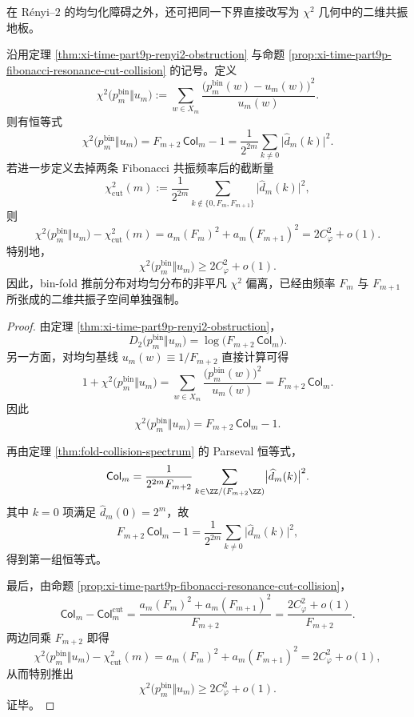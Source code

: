 在 Rényi--\(2\) 的均匀化障碍之外，还可把同一下界直接改写为 \(\chi^2\) 几何中的二维共振地板。

\begin{theorem}\label{thm:xi-time-part9p-chi2-ranktwo-resonant-floor}
沿用定理 \ref{thm:xi-time-part9p-renyi2-obstruction} 与命题 \ref{prop:xi-time-part9p-fibonacci-resonance-cut-collision} 的记号。定义
\[
\chi^2\bigl(p_m^{\mathrm{bin}}\Vert u_m\bigr)
:=
\sum_{w\in X_m}
\frac{\bigl(p_m^{\mathrm{bin}}(w)-u_m(w)\bigr)^2}{u_m(w)}.
\]
则有恒等式
\[
\chi^2\bigl(p_m^{\mathrm{bin}}\Vert u_m\bigr)
=
F_{m+2}\,\mathsf{Col}_m-1
=
\frac{1}{2^{2m}}
\sum_{k\ne 0}\bigl|\widehat d_m(k)\bigr|^2.
\]
若进一步定义去掉两条 Fibonacci 共振频率后的截断量
\[
\chi^2_{\mathrm{cut}}(m)
:=
\frac{1}{2^{2m}}
\sum_{k\notin\{0,F_m,F_{m+1}\}}
\bigl|\widehat d_m(k)\bigr|^2,
\]
则
\[
\chi^2\bigl(p_m^{\mathrm{bin}}\Vert u_m\bigr)-\chi^2_{\mathrm{cut}}(m)
=
a_m(F_m)^2+a_m(F_{m+1})^2
=
2C_\varphi^2+o(1).
\]
特别地，
\[
\chi^2\bigl(p_m^{\mathrm{bin}}\Vert u_m\bigr)\ge 2C_\varphi^2+o(1).
\]
因此，bin-fold 推前分布对均匀分布的非平凡 \(\chi^2\) 偏离，已经由频率 \(F_m\) 与 \(F_{m+1}\) 所张成的二维共振子空间单独强制。
\end{theorem}
\begin{proof}
由定理 \ref{thm:xi-time-part9p-renyi2-obstruction}，
\[
D_2\bigl(p_m^{\mathrm{bin}}\Vert u_m\bigr)
=
\log\!\bigl(F_{m+2}\,\mathsf{Col}_m\bigr).
\]
另一方面，对均匀基线 \(u_m(w)\equiv 1/F_{m+2}\) 直接计算可得
\[
1+\chi^2\bigl(p_m^{\mathrm{bin}}\Vert u_m\bigr)
=
\sum_{w\in X_m}\frac{\bigl(p_m^{\mathrm{bin}}(w)\bigr)^2}{u_m(w)}
=
F_{m+2}\,\mathsf{Col}_m.
\]
因此
\[
\chi^2\bigl(p_m^{\mathrm{bin}}\Vert u_m\bigr)
=
F_{m+2}\,\mathsf{Col}_m-1.
\]

再由定理 \ref{thm:fold-collision-spectrum} 的 Parseval 恒等式，
\[
\mathsf{Col}_m
=
\frac{1}{2^{2m}F_{m+2}}
\sum_{k\in\ZZ/(F_{m+2}\ZZ)}
\bigl|\widehat d_m(k)\bigr|^2.
\]
其中 \(k=0\) 项满足 \(\widehat d_m(0)=2^m\)，故
\[
F_{m+2}\,\mathsf{Col}_m-1
=
\frac{1}{2^{2m}}
\sum_{k\ne 0}\bigl|\widehat d_m(k)\bigr|^2,
\]
得到第一组恒等式。

最后，由命题 \ref{prop:xi-time-part9p-fibonacci-resonance-cut-collision}，
\[
\mathsf{Col}_m-\mathsf{Col}_m^{\mathrm{cut}}
=
\frac{a_m(F_m)^2+a_m(F_{m+1})^2}{F_{m+2}}
=
\frac{2C_\varphi^2+o(1)}{F_{m+2}}.
\]
两边同乘 \(F_{m+2}\) 即得
\[
\chi^2\bigl(p_m^{\mathrm{bin}}\Vert u_m\bigr)-\chi^2_{\mathrm{cut}}(m)
=
a_m(F_m)^2+a_m(F_{m+1})^2
=
2C_\varphi^2+o(1),
\]
从而特别推出
\[
\chi^2\bigl(p_m^{\mathrm{bin}}\Vert u_m\bigr)\ge 2C_\varphi^2+o(1).
\]
证毕。
\end{proof}

\endinput
